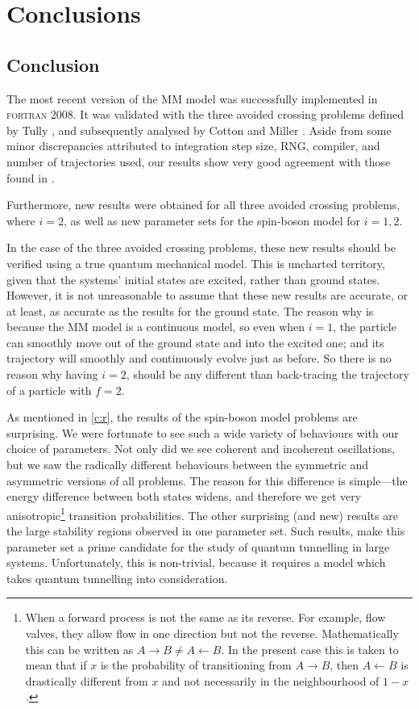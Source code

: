 \chapter{Conclusions}\label{c:conc}
%
\section{Conclusion}
%
The most recent version of the MM model was successfully implemented in \textsc{fortran 2008}. It was validated with the three avoided crossing problems defined by Tully \cite{tully}, and subsequently analysed by Cotton and Miller \cite{project}. Aside from some minor discrepancies attributed to integration step size, RNG, compiler, and number of trajectories used, our results show very good agreement with those found in \cite{project}.

Furthermore, new results were obtained for all three avoided crossing problems, where $ i = 2 $, as well as new parameter sets for the spin-boson model for $ i = 1, 2 $. 

In the case of the three avoided crossing problems, these new results should be verified using a true quantum mechanical model. This is uncharted territory, given that the systems' initial states are excited, rather than ground states. However, it is not unreasonable to assume that these new results are accurate, or at least, as accurate as the results for the ground state. The reason why is because the MM model is a continuous model, so even when $ i = 1 $, the particle can smoothly move out of the ground state and into the excited one; and its trajectory will smoothly and continuously evolve just as before. So there is no reason why having $ i = 2 $, should be any different than back-tracing the trajectory of a particle with $ f = 2 $.

As mentioned in \cref{c:r}, the results of the spin-boson model problems are surprising. We were fortunate to see such a wide variety of behaviours with our choice of parameters. Not only did we see coherent and incoherent oscillations, but we saw the radically different behaviours between the symmetric and asymmetric versions of all problems. The reason for this difference is simple---the energy difference between both states widens, and therefore we get very anisotropic\footnote{When a forward process is not the same as its reverse. For example, flow valves, they allow flow in one direction but not the reverse. Mathematically this can be written as $ A \rightarrow B \neq A \leftarrow B$. In the present case this is taken to mean that if $ x $ is the probability of transitioning from $ A \rightarrow B $, then $ A \leftarrow B $ is drastically different from $ x $ and not necessarily in the neighbourhood of $ 1-x $.} transition probabilities. The other surprising (and new) results are the large stability regions observed in one parameter set. Such results, make this parameter set a prime candidate for the study of quantum tunnelling in large systems. Unfortunately, this is non-trivial, because it requires a model which takes quantum tunnelling into consideration.

